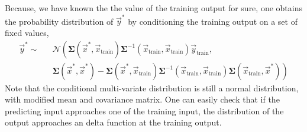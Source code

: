 Because, we have known the the value of the training output for sure, one obtains the probability distribution of $\vec{y}^*$ by conditioning the training output on a set of fixed values,
\begin{eqnarray}
\vec{y}^* \sim &&\mathcal{N}\left(
\mathbf{\Sigma}(\vec{x}^*, \vec{x}_{\textrm{train}} )
\mathbf{\Sigma}^{-1}(\vec{x}_{\textrm{train}}, \vec{x}_{\textrm{train}} )\vec{y}_{\textrm{train}},\right.\\\nonumber
&&\left.
\mathbf{\Sigma}(\vec{x}^*, \vec{x}^*) - 
\mathbf{\Sigma}(\vec{x}^*, \vec{x}_{\textrm{train}} )
\mathbf{\Sigma}^{-1}(\vec{x}_{\textrm{train}}, \vec{x}_{\textrm{train}} )
\mathbf{\Sigma}(\vec{x}_{\textrm{train}},\vec{x}^*)
\right)
\end{eqnarray}
Note that the conditional multi-variate distribution is still a normal distribution, with modified mean and covariance matrix.
One can easily check that if the predicting input approaches one of the training input, the distribution of the output approaches an delta function at the training output.





